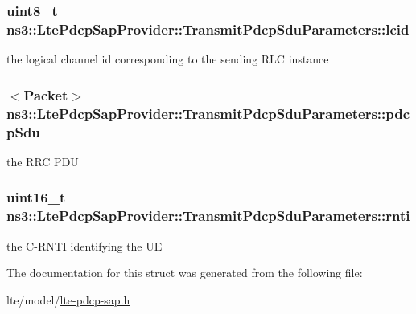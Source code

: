 \subsubsection[{\texorpdfstring{lcid}{lcid}}]{\setlength{\rightskip}{0pt plus 5cm}uint8\+\_\+t ns3\+::\+Lte\+Pdcp\+Sap\+Provider\+::\+Transmit\+Pdcp\+Sdu\+Parameters\+::lcid}\hypertarget{structns3_1_1LtePdcpSapProvider_1_1TransmitPdcpSduParameters_a8b9904d4b2a62b6576188a84b7142ff6}{}\label{structns3_1_1LtePdcpSapProvider_1_1TransmitPdcpSduParameters_a8b9904d4b2a62b6576188a84b7142ff6}
the logical channel id corresponding to the sending R\+LC instance 
\subsubsection[{\texorpdfstring{pdcp\+Sdu}{pdcpSdu}}]{$<${\bf Packet}$>$ ns3\+::\+Lte\+Pdcp\+Sap\+Provider\+::\+Transmit\+Pdcp\+Sdu\+Parameters\+::pdcp\+Sdu}\hypertarget{structns3_1_1LtePdcpSapProvider_1_1TransmitPdcpSduParameters_ac9f5e992cf1231a4c525215bdf62628c}{}\label{structns3_1_1LtePdcpSapProvider_1_1TransmitPdcpSduParameters_ac9f5e992cf1231a4c525215bdf62628c}
the R\+RC P\+DU 
\subsubsection[{\texorpdfstring{rnti}{rnti}}]{\setlength{\rightskip}{0pt plus 5cm}uint16\+\_\+t ns3\+::\+Lte\+Pdcp\+Sap\+Provider\+::\+Transmit\+Pdcp\+Sdu\+Parameters\+::rnti}\hypertarget{structns3_1_1LtePdcpSapProvider_1_1TransmitPdcpSduParameters_ae6083461f8f42ea8deb48e5892f56954}{}\label{structns3_1_1LtePdcpSapProvider_1_1TransmitPdcpSduParameters_ae6083461f8f42ea8deb48e5892f56954}
the C-\/\+R\+N\+TI identifying the UE 

The documentation for this struct was generated from the following file\+:\begin{DoxyCompactItemize}
\item 
lte/model/\hyperlink{lte-pdcp-sap_8h}{lte-\/pdcp-\/sap.\+h}\end{DoxyCompactItemize}
